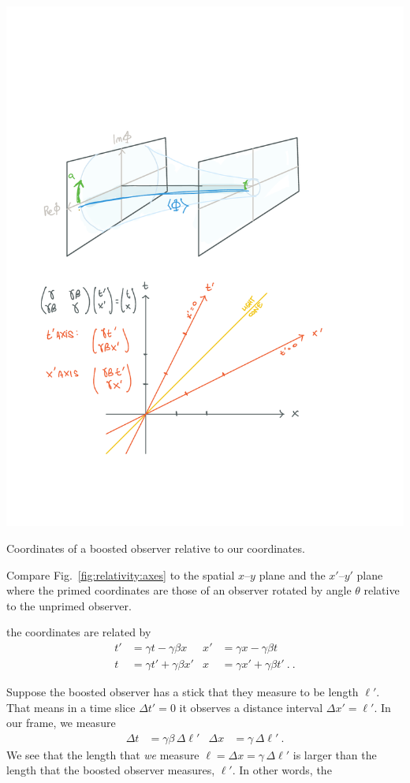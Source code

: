 \documentclass[12pt, oneside]{report}    %
\begin{document}
\begin{marginfigure}%
    \includegraphics[width=\textwidth]{figures/rel_axes.pdf}
    \caption{Coordinates of a boosted observer relative to our coordinates.}
    \label{fig:relativity:axes}
\end{marginfigure}
\begin{exercise}
Compare Fig.~\ref{fig:relativity:axes} to the spatial $x$--$y$ plane and the $x'$--$y'$ plane where the primed coordinates are those of an observer rotated by angle $\theta$ relative to the unprimed observer.
\end{exercise}
the coordinates are related by
\begin{align}
    t' &= \gamma t - \gamma\beta x &
    x' &= \gamma x - \gamma\beta t \\
    t &= \gamma t' + \gamma\beta x' &
    x &= \gamma x' + \gamma\beta t' \ .
    \ .
\end{align}
\begin{example}
Suppose the boosted observer has a stick that they measure to be length $\ell'$. That means in a time slice $\Delta t' = 0$ it observes a distance interval $\Delta x' = \ell'$. In our frame, we measure
\begin{align}
    \Delta t &= \gamma \beta \,\Delta \ell'
    &
    \Delta x &= \gamma \,\Delta\ell' \ .
\end{align}
We see that the length that \emph{we} measure $\ell = \Delta x = \gamma\,\Delta\ell'$ is larger than the length that the boosted observer measures, $\ell'$. In other words, the 
\end{example}
\end{document}
